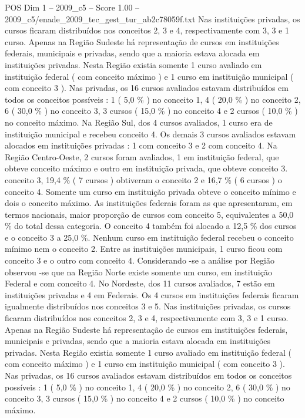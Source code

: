 \begin{textsample}{POS Dim 1 – 2009\_c5 – Score 1.00 – 2009\_c5/enade\_2009\_tec\_gest\_tur\_ab2c78059f.txt}
Nas instituições privadas, os cursos ficaram distribuídos nos conceitos 2, 3 e 4, respectivamente com 3, 3 e 1 curso.
Apenas na Região Sudeste há representação de cursos em instituições federais, municipais e privadas, sendo que a maioria estava alocada em instituições privadas.
Nesta Região existia somente 1 curso avaliado em instituição federal ( com conceito máximo ) e 1 curso em instituição municipal ( com conceito 3 ).
Nas privadas, os 16 cursos avaliados estavam distribuídos em todos os conceitos possíveis : 1 ( 5,0 \% ) no conceito 1, 4 ( 20,0 \% ) no conceito 2, 6 ( 30,0 \% ) no conceito 3, 3 cursos ( 15,0 \% ) no conceito 4 e 2 cursos ( 10,0 \% ) no conceito máximo.
Na Região Sul, dos 4 cursos avaliados, 1 curso era de instituição municipal e recebeu conceito 4.
Os demais 3 cursos avaliados estavam alocados em instituições privadas : 1 com conceito 3 e 2 com conceito 4.
Na Região Centro-Oeste, 2 cursos foram avaliados, 1 em instituição federal, que obteve conceito máximo e outro em instituição privada, que obteve conceito 3. conceito 3, 19,4 \% ( 7 cursos ) obtiveram o conceito 2 e 16,7 \% ( 6 cursos ) o conceito 4.
Somente um curso em instituição privada obteve o conceito mínimo e dois o conceito máximo.
As instituições federais foram as que apresentaram, em termos nacionais, maior proporção de cursos com conceito 5, equivalentes a 50,0 \% do total dessa categoria.
O conceito 4 também foi alocado a 12,5 \% dos cursos e o conceito 3 a 25,0 \%.
Nenhum curso em instituição federal recebeu o conceito mínimo nem o conceito 2.
Entre as instituições municipais, 1 curso ficou com conceito 3 e o outro com conceito 4.
Considerando -se a análise por Região observou -se que na Região Norte existe somente um curso, em instituição Federal e com conceito 4.
No Nordeste, dos 11 cursos avaliados, 7 estão em instituições privadas e 4 em Federais.
Os 4 cursos em instituições federais ficaram igualmente distribuídos nos conceitos 3 e 5.
Nas instituições privadas, os cursos ficaram distribuídos nos conceitos 2, 3 e 4, respectivamente com 3, 3 e 1 curso.
Apenas na Região Sudeste há representação de cursos em instituições federais, municipais e privadas, sendo que a maioria estava alocada em instituições privadas.
Nesta Região existia somente 1 curso avaliado em instituição federal ( com conceito máximo ) e 1 curso em instituição municipal ( com conceito 3 ).
Nas privadas, os 16 cursos avaliados estavam distribuídos em todos os conceitos possíveis : 1 ( 5,0 \% ) no conceito 1, 4 ( 20,0 \% ) no conceito 2, 6 ( 30,0 \% ) no conceito 3, 3 cursos ( 15,0 \% ) no conceito 4 e 2 cursos ( 10,0 \% ) no conceito máximo.

\end{textsample}
